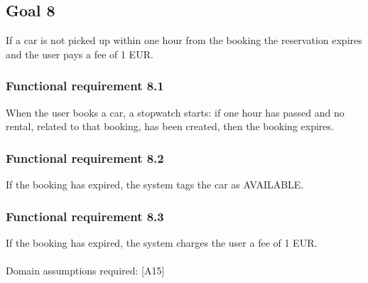 \subsection{Goal 8}
If a car is not picked up within one hour from the booking the reservation expires and the user pays a fee of 1 EUR.

\setcounter{secnumdepth}{3}
\subsubsection{Functional requirement 8.1}
When the user books a car, a stopwatch starts: if one hour has passed and no rental, related to that booking, has been created, then the booking expires.

\subsubsection{Functional requirement 8.2}
If the booking has expired, the system tags the car as AVAILABLE.

\subsubsection{Functional requirement 8.3}
 If the booking has expired, the system charges the user a fee of 1 EUR.\\~\\
\noindent Domain assumptions required: [A15]